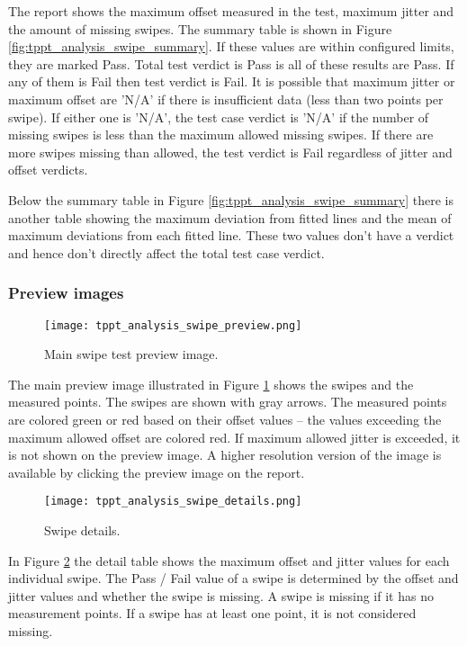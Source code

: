 The report shows the maximum offset measured in the test, maximum jitter and the amount of missing swipes. The summary table is shown in Figure \ref{fig:tppt_analysis_swipe_summary}. If these values are within configured limits, they are marked Pass. Total test verdict is Pass is all of these results are Pass. If any of them is Fail then test verdict is Fail. It is possible that maximum jitter or maximum offset are 'N/A' if there is insufficient data (less than two points per swipe). If either one is 'N/A', the test case verdict is 'N/A' if the number of missing swipes is less than the maximum allowed missing swipes. If there are more swipes missing than allowed, the test verdict is Fail regardless of jitter and offset verdicts.

Below the summary table in Figure \ref{fig:tppt_analysis_swipe_summary} there is another table showing the maximum deviation from fitted lines and the mean of maximum deviations from each fitted line. These two values don't have a verdict and hence don't directly affect the total test case verdict.

\subsubsection{Preview images}

\begin{figure}[!h]
	\centering
	\texttt{[image: tppt\_analysis\_swipe\_preview.png]}
	\caption{Main swipe test preview image.}
	\label{fig:tppt_analysis_swipe_preview}
\end{figure}

The main preview image illustrated in Figure \ref{fig:tppt_analysis_swipe_preview} shows the swipes and the measured points. The swipes are shown with gray arrows. The measured points are colored green or red based on their offset values – the values exceeding the maximum allowed offset are colored red. If maximum allowed jitter is exceeded, it is not shown on the preview image. A higher resolution version of the image is available by clicking the preview image on the report.

\begin{figure}[!h]
	\centering
	\texttt{[image: tppt\_analysis\_swipe\_details.png]}
	\caption{Swipe details.}
	\label{fig:tppt_analysis_swipe_details}
\end{figure}

In Figure \ref{fig:tppt_analysis_swipe_details} the detail table shows the maximum offset and jitter values for each individual swipe. The Pass / Fail value of a swipe is determined by the offset and jitter values and whether the swipe is missing. A swipe is missing if it has no measurement points. If a swipe has at least one point, it is not considered missing.

